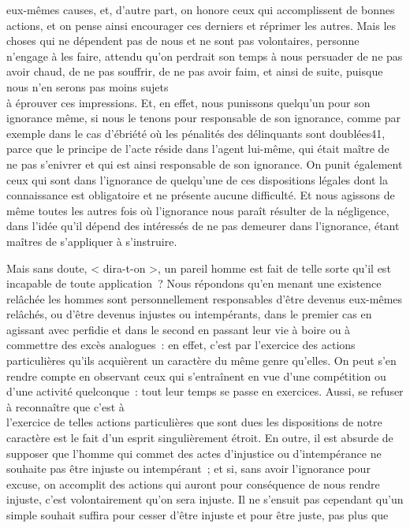 \documentclass[french,twoside]{book} %
\begin{document}
eux-mêmes causes, et, d’autre part, on honore ceux qui accomplissent de bonnes actions, et on pense ainsi encourager ces derniers et réprimer les autres. Mais les choses qui ne dépendent pas de nous et ne sont pas volontaires, personne n’engage à les faire, attendu qu’on perdrait son temps à nous persuader de ne pas avoir chaud, de ne pas souffrir, de ne pas avoir faim, et ainsi de suite, puisque nous n’en serons pas moins sujets \\
à éprouver ces impressions. Et, en effet, nous punissons quelqu’un pour son ignorance même, si nous le tenons pour responsable de son ignorance, comme par exemple dans le cas d’ébriété où les pénalités des délinquants sont doublées41, parce que le principe de l’acte réside dans l’agent lui-même, qui était maître de ne pas s’enivrer et qui est ainsi responsable de son ignorance. On punit également ceux qui sont dans l’ignorance de quelqu’une de ces dispositions légales dont la connaissance est obligatoire et ne présente aucune difficulté. Et nous  agissons de même toutes les autres fois où l’ignorance nous paraît résulter de la négligence, dans l’idée qu’il dépend des intéressés de ne pas demeurer dans l’ignorance, étant maîtres de s’appliquer à s’instruire.\par
Mais sans doute, < dira-t-on >, un pareil homme est fait de telle sorte qu’il est incapable de toute application ? Nous répondons qu’en menant une existence relâchée les hommes sont personnellement responsables d’être devenus eux-mêmes \\
relâchés, ou d’être devenus injustes ou intempérants, dans le premier cas en agissant avec perfidie et dans le second en passant leur vie à boire ou à commettre des excès analogues : en effet, c’est par l’exercice des actions particulières qu’ils acquièrent un caractère du même genre qu’elles. On peut s’en rendre compte en observant ceux qui s’entraînent en vue d’une compétition ou d’une activité quelconque : tout leur temps se passe en exercices. Aussi, se refuser à reconnaître que c’est à \\
l’exercice de telles actions particulières que sont dues les dispositions de notre caractère est le fait d’un esprit singulièrement étroit. En outre, il est absurde de supposer que l’homme qui commet des actes d’injustice ou d’intempérance ne souhaite pas être injuste ou intempérant ; et si, sans avoir l’ignorance pour excuse, on accomplit des actions qui auront pour conséquence de nous rendre injuste, c’est volontairement qu’on sera injuste. Il ne s’ensuit pas cependant qu’un simple souhait suffira pour cesser d’être injuste et pour être juste, pas plus que \\
\end{document}

